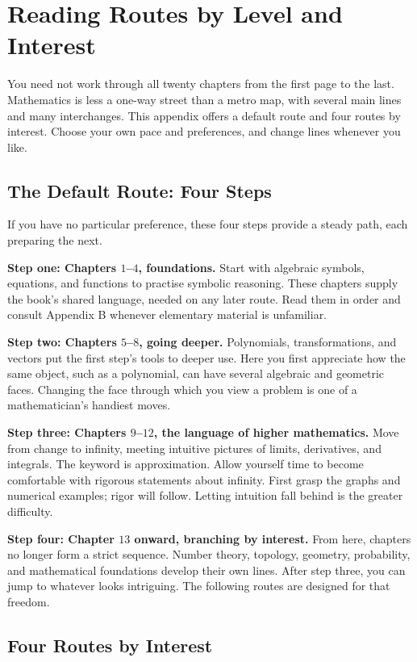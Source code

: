 \chapter{Reading Routes by Level and Interest}

You need not work through all twenty chapters from the first page to the last. Mathematics is less a one-way street than a metro map, with several main lines and many interchanges. This appendix offers a default route and four routes by interest. Choose your own pace and preferences, and change lines whenever you like.

\section{The Default Route: Four Steps}

If you have no particular preference, these four steps provide a steady path, each preparing the next.

\textbf{Step one: Chapters $1$--$4$, foundations.} Start with algebraic symbols, equations, and functions to practise symbolic reasoning. These chapters supply the book's shared language, needed on any later route. Read them in order and consult Appendix B whenever elementary material is unfamiliar.

\textbf{Step two: Chapters $5$--$8$, going deeper.} Polynomials, transformations, and vectors put the first step's tools to deeper use. Here you first appreciate how the same object, such as a polynomial, can have several algebraic and geometric faces. Changing the face through which you view a problem is one of a mathematician's handiest moves.

\textbf{Step three: Chapters $9$--$12$, the language of higher mathematics.} Move from change to infinity, meeting intuitive pictures of limits, derivatives, and integrals. The keyword is approximation. Allow yourself time to become comfortable with rigorous statements about infinity. First grasp the graphs and numerical examples; rigor will follow. Letting intuition fall behind is the greater difficulty.

\textbf{Step four: Chapter $13$ onward, branching by interest.} From here, chapters no longer form a strict sequence. Number theory, topology, geometry, probability, and mathematical foundations develop their own lines. After step three, you can jump to whatever looks intriguing. The following routes are designed for that freedom.

\section{Four Routes by Interest}

